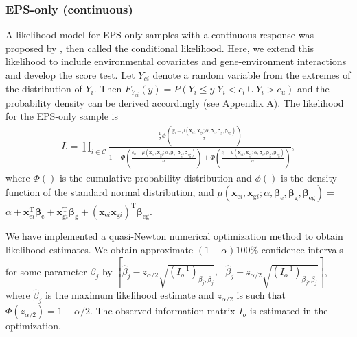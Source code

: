 \documentclass[10pt,a4paper]{article}
\def\bbetag{\bm{\beta}_{\text{g}}}
\def\bbetae{\bm{\beta}_{\text{e}}}
\def\bbetaeg{\bm{\beta}_{\text{eg}}}
\def\bxgi{\mathbf{x}_{\text{g}i}}
\def\bxei{\mathbf{x}_{\text{e}i}}
\begin{document}
\subsubsection{EPS-only (continuous)}
A likelihood model for EPS-only samples with a continuous response was proposed by \cite{huang2007eps}, then called the conditional likelihood. Here, we extend this likelihood to include environmental covariates and gene-environment interactions and develop the score test. Let $Y_{ci}$ denote a random variable from the extremes of the distribution of $Y_i$. Then $F_{Y_{ci}}(y) = P(Y_i \leq y | Y_i < c_l \cup Y_i > c_u)$ and the probability density can be derived accordingly (see Appendix A). The likelihood for the EPS-only sample is
\begin{align}
L = \prod_{i \in \mathcal{C}} \frac{ \frac{1}{\sigma} \phi \left( \frac{y_i - \mu(\bxei, \bxgi; \alpha, \bbetae, \bbetag, \bbetaeg)}{\sigma} \right)}{1 - \Phi \left( \frac{c_u - \mu(\bxei, \bxgi; \alpha, \bbetae, \bbetag, \bbetaeg)}{\sigma} \right) + \Phi \left( \frac{c_l - \mu(\bxei, \bxgi; \alpha, \bbetae, \bbetag, \bbetaeg)}{\sigma} \right)},
\label{eq:cclik}
\end{align}
where $\Phi()$ is the cumulative probability distribution and $\phi()$ is the density function of the standard normal distribution, and $\mu(\bxei, \bxgi; \alpha, \bbetae, \bbetag, \bbetaeg) = $  $\alpha + \bxei^{\text{T}}\bbetae + \bxgi^{\text{T}} \bbetag + (\bxei \bxgi)^{\text{T}} \bbetaeg$.

We have implemented a quasi-Newton numerical optimization method to obtain likelihood estimates. We obtain approximate $(1-\alpha)100\%$ confidence intervals for some parameter $\beta_{j}$ by $ \left[ \hat{\beta}_{j} - z_{\alpha/2}\sqrt{(I_o^{-1})_{\beta_{j}, \beta_{j}}}, \text{ } \hat{\beta}_{j} + z_{\alpha/2} \sqrt{(I_o^{-1})_{\beta_{j}, \beta_{j}}} \right] $, where $\hat{\beta}_j$ is the maximum likelihood estimate and $z_{\alpha/2}$ is such that $\Phi(z_{\alpha/2}) = 1 - \alpha/2$. The observed information matrix $I_o$ is estimated in the optimization.
\end{document}
